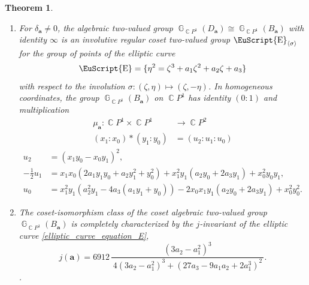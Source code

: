 \documentclass[14pt, dvipsnames]{extarticle}
\theoremstyle{plain}
\newtheorem{theorem}{Theorem}
\theoremstyle{definition}
\theoremstyle{remark}
\DeclareMathOperator{\E}{\EuScript{E}}
\DeclareMathOperator{\G}{\mathbb{G}}
\DeclareMathOperator{\Cc}{\mathbb{C}}
\begin{document}
\begin{theorem}\label{2-valued_group}
\leavevmode
\begin{enumerate}[\bf (i)]
\item For $\delta_{\boldsymbol{a}}\neq 0$, the algebraic two-valued group $\G_{\Cc\!P^1}(D_{\boldsymbol{a}})\cong\G_{\Cc\!P^1}(B_{\boldsymbol{a}})$ with identity $\infty$ is an involutive regular coset two-valued group $\E_{\langle\sigma\rangle}$ for the group of points of the elliptic curve
\begin{equation}\label{elliptic_curve_equation_E}
\E = \{\eta^2 = \zeta^3 + a_1\zeta^2 + a_2\zeta + a_3\}
\end{equation}
with respect to the involution $\sigma: (\zeta, \eta)\mapsto (\zeta, -\eta)$. In homogeneous coordinates, the group $\G_{\Cc\!P^1}(B_{\boldsymbol{a}})$ on $\Cc\!P^1$ has identity $(0:1)$ and multiplication
$$\begin{aligned}
\mu_{\boldsymbol{a}}: \Cc\!P^1\times\Cc\!P^1&\to \Cc\!P^2\\
(x_1:x_0)\ast(y_1:y_0) &= (u_2 : u_1 : u_0)
\end{aligned}$$
\begin{align}\label{multiplication_mu}
u_2 &= \left(x_1 y_0-x_0 y_1\right)^2,\nonumber\\
-\frac{1}{2}u_1 &= x_1 x_0 \left(2 a_1 y_1 y_0+a_2 y_1^2+y_0^2\right)+x_1^2 y_1 \left(a_2 y_0+2 a_3 y_1\right)+x_0^2 y_0 y_1,\nonumber\\
u_0 &= x_1^2 y_1 \left(a_2^2 y_1-4 a_3 \left(a_1 y_1+y_0\right)\right)-2 x_0 x_1 y_1 \left(a_2 y_0+2 a_3 y_1\right)+x_0^2 y_0^2.\nonumber
\end{align}


\item {The coset-isomorphism class} of the coset algebraic two-valued group $\G_{\Cc\!P^1}(B_{\boldsymbol{a}})$ is completely characterized by the $j$-invariant of the elliptic curve {\normalfont \eqref{elliptic_curve_equation_E}},
$$j(\boldsymbol{a}) = 6912\,\frac{(3 a_2 - a_1^2)^3}{\,4(3 a_2 - a_1^2)^3 + (27 a_3 - 9 a_1 a_2 + 2 a_1^3)^2\,}.$$.
\end{enumerate}
\end{theorem}
\end{document}
